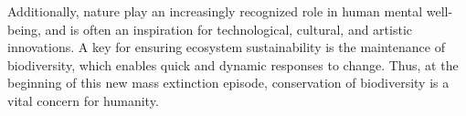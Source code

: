 \documentclass[12pt,a4paper]{article}
\begin{document}
Additionally, nature play an increasingly recognized role in human mental well-being, and is often an inspiration for technological, cultural, and artistic innovations.
A key for ensuring ecosystem sustainability is the maintenance of biodiversity, which enables quick and dynamic responses to change.
Thus, at the beginning of this new mass extinction episode, conservation of biodiversity is a vital concern for humanity.
%
\end{document}

